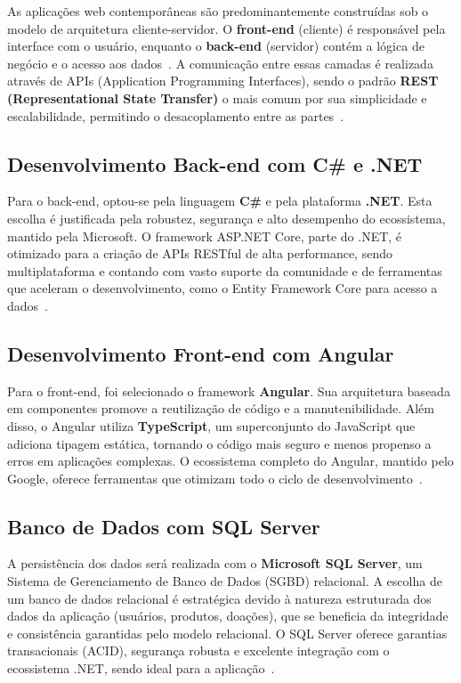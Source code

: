 \documentclass[
	12pt,				%
	openright,			%
	oneside,			%
	a4paper,			%
	english,			%
	brazil				%
	]{abntex2}
\theoremstyle{definition}
\begin{document}
As aplicações web contemporâneas são predominantemente construídas sob o modelo de arquitetura cliente-servidor. O \textbf{front-end} (cliente) é responsável pela interface com o usuário, enquanto o \textbf{back-end} (servidor) contém a lógica de negócio e o acesso aos dados~\cite{Pressman2014}. A comunicação entre essas camadas é realizada através de APIs (Application Programming Interfaces), sendo o padrão \textbf{REST (Representational State Transfer)} o mais comum por sua simplicidade e escalabilidade, permitindo o desacoplamento entre as partes~\cite{fielding2000}.

\subsection{Desenvolvimento Back-end com C\# e .NET}

Para o back-end, optou-se pela linguagem \textbf{C\#} e pela plataforma \textbf{.NET}. Esta escolha é justificada pela robustez, segurança e alto desempenho do ecossistema, mantido pela Microsoft. O framework ASP.NET Core, parte do .NET, é otimizado para a criação de APIs RESTful de alta performance, sendo multiplataforma e contando com vasto suporte da comunidade e de ferramentas que aceleram o desenvolvimento, como o Entity Framework Core para acesso a dados~\cite{dotnet2024}.

\subsection{Desenvolvimento Front-end com Angular}

Para o front-end, foi selecionado o framework \textbf{Angular}. Sua arquitetura baseada em componentes promove a reutilização de código e a manutenibilidade. Além disso, o Angular utiliza \textbf{TypeScript}, um superconjunto do JavaScript que adiciona tipagem estática, tornando o código mais seguro e menos propenso a erros em aplicações complexas. O ecossistema completo do Angular, mantido pelo Google, oferece ferramentas que otimizam todo o ciclo de desenvolvimento~\cite{angular2024}.

\subsection{Banco de Dados com SQL Server}

A persistência dos dados será realizada com o \textbf{Microsoft SQL Server}, um Sistema de Gerenciamento de Banco de Dados (SGBD) relacional. A escolha de um banco de dados relacional é estratégica devido à natureza estruturada dos dados da aplicação (usuários, produtos, doações), que se beneficia da integridade e consistência garantidas pelo modelo relacional. O SQL Server oferece garantias transacionais (ACID), segurança robusta e excelente integração com o ecossistema .NET, sendo ideal para a aplicação~\cite{sqlserver2024}.
\end{document}
